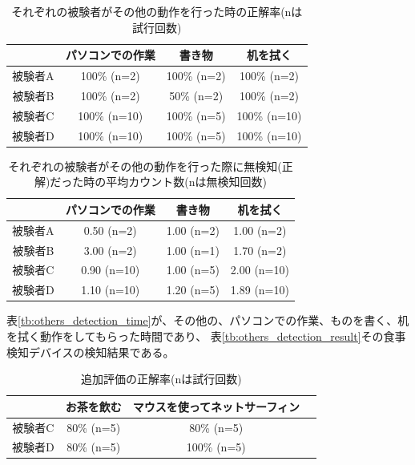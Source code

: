 \begin{table}[htbp]
  \caption{それぞれの被験者がその他の動作を行った時の正解率(nは試行回数)}
  \label{tb:others_detection_percentage}
  \begin{center}
    \begin{tabular}{|c||c|c|c|}
      \hline
       & パソコンでの作業 & 書き物 & 机を拭く \\
      \hline\hline
      被験者A  & 100\% (n=2) & 100\% (n=2) & 100\% (n=2) \\\hline
      被験者B  & 100\% (n=2) & 50\% (n=2) & 100\% (n=2) \\\hline
      被験者C & 100\% (n=10) & 100\% (n=5) & 100\% (n=10) \\\hline
      被験者D & 100\% (n=10) & 100\% (n=5) & 100\% (n=10) \\\hline
    \end{tabular}
  \end{center}
\end{table}

\begin{table}[htbp]
  \caption{それぞれの被験者がその他の動作を行った際に無検知(正解)だった時の平均カウント数(nは無検知回数)}
  \label{tb:others_detection_count}
  \begin{center}
    \begin{tabular}{|c||c|c|c|}
      \hline
       & パソコンでの作業 & 書き物 & 机を拭く \\
      \hline\hline
      被験者A  & 0.50 (n=2) & 1.00 (n=2) & 1.00 (n=2) \\\hline
      被験者B  & 3.00 (n=2) & 1.00 (n=1) & 1.70 (n=2) \\\hline
      被験者C & 0.90 (n=10) & 1.00 (n=5) & 2.00 (n=10) \\\hline
      被験者D & 1.10 (n=10) & 1.20 (n=5) & 1.89 (n=10) \\\hline
    \end{tabular}
  \end{center}
\end{table}

表\ref{tb:others_detection_time}が、その他の、パソコンでの作業、ものを書く、机を拭く動作をしてもらった時間であり、
表\ref{tb:others_detection_result}その食事検知デバイスの検知結果である。

\begin{table}[htbp]
  \caption{追加評価の正解率(nは試行回数)}
  \label{tb:additional_detection_percentage}
  \begin{center}
    \begin{tabular}{|c||c|c|c|}
      \hline
       & お茶を飲む  & マウスを使ってネットサーフィン \\
      \hline\hline
      被験者C & 80\% (n=5) & 80\% (n=5) \\\hline
      被験者D & 80\% (n=5) & 100\% (n=5) \\\hline
    \end{tabular}
  \end{center}
\end{table}


